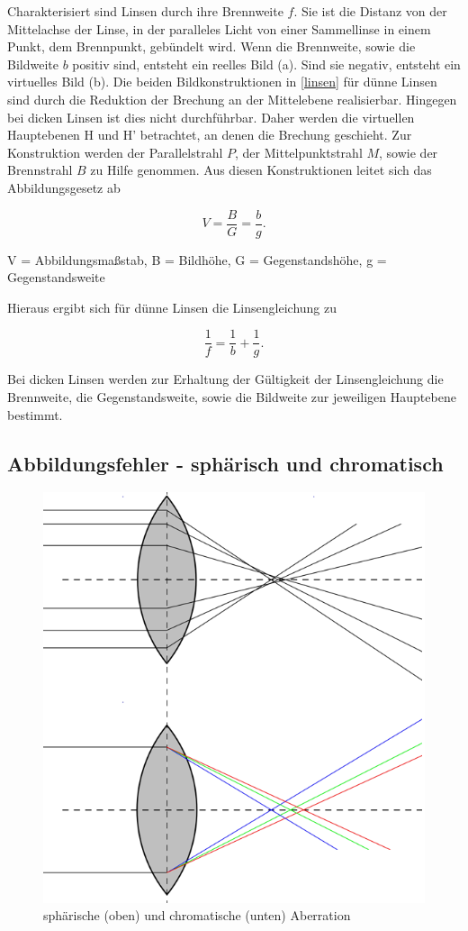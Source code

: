 Charakterisiert sind Linsen durch ihre Brennweite $f$. Sie ist die Distanz von der Mittelachse der Linse, in der paralleles Licht von
einer Sammellinse in einem Punkt, dem Brennpunkt, gebündelt wird. Wenn die Brennweite, sowie die Bildweite $b$ positiv sind, entsteht
ein reelles Bild (a). Sind sie negativ, entsteht ein virtuelles Bild (b). Die beiden Bildkonstruktionen in \ref{linsen} für dünne
Linsen sind durch die Reduktion der Brechung an der Mittelebene realisierbar. Hingegen bei dicken Linsen ist dies nicht durchführbar.
Daher werden die virtuellen Hauptebenen H und H' betrachtet, an denen die Brechung geschieht. Zur Konstruktion werden der Parallelstrahl $P$, der
Mittelpunktstrahl $M$, sowie der Brennstrahl $B$ zu Hilfe genommen. Aus diesen Konstruktionen leitet sich das Abbildungsgesetz ab

\begin{formel}
 \begin{equation}
  V = \frac{B}{G} = \frac{b}{g}.
  \label{Abbildung}
 \end{equation}
 \caption*{\small{V = Abbildungsmaßstab, B = Bildhöhe, G = Gegenstandshöhe, g = Gegenstandsweite}}
\end{formel}

Hieraus ergibt sich für dünne Linsen die Linsengleichung zu

\begin{equation}
 \frac1f = \frac1b + \frac1g.
 \label{Linsengleichung}
\end{equation}

Bei dicken Linsen werden zur Erhaltung der Gültigkeit der Linsengleichung die Brennweite, die Gegenstandsweite, sowie die Bildweite 
zur jeweiligen Hauptebene bestimmt. 

\subsection{Abbildungsfehler - sphärisch und chromatisch}

\begin{figure}
\includegraphics[width = 0.5 \textwidth]{pics/408b.png}  
\caption{sphärische (oben) und chromatische (unten) Aberration}
\end{figure}


